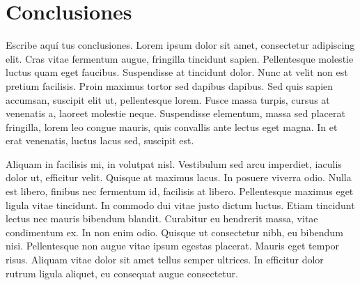 
\pagestyle{myportland}
\doublespacing
\chapter*{\centering \large Conclusiones}
\thispagestyle{myportland}

Escribe aquí tus conclusiones. Lorem ipsum dolor sit amet, consectetur adipiscing elit. Cras vitae fermentum augue, fringilla tincidunt sapien. Pellentesque molestie luctus quam eget faucibus. Suspendisse at tincidunt dolor. Nunc at velit non est pretium facilisis. Proin maximus tortor sed dapibus dapibus. Sed quis sapien accumsan, suscipit elit ut, pellentesque lorem. Fusce massa turpis, cursus at venenatis a, laoreet molestie neque. Suspendisse elementum, massa sed placerat fringilla, lorem leo congue mauris, quis convallis ante lectus eget magna. In et erat venenatis, luctus lacus sed, suscipit est.

Aliquam in facilisis mi, in volutpat nisl. Vestibulum sed arcu imperdiet, iaculis dolor ut, efficitur velit. Quisque at maximus lacus. In posuere viverra odio. Nulla est libero, finibus nec fermentum id, facilisis at libero. Pellentesque maximus eget ligula vitae tincidunt. In commodo dui vitae justo dictum luctus. Etiam tincidunt lectus nec mauris bibendum blandit. Curabitur eu hendrerit massa, vitae condimentum ex. In non enim odio. Quisque ut consectetur nibh, eu bibendum nisi. Pellentesque non augue vitae ipsum egestas placerat. Mauris eget tempor risus. Aliquam vitae dolor sit amet tellus semper ultrices. In efficitur dolor rutrum ligula aliquet, eu consequat augue consectetur.\cite{2005}